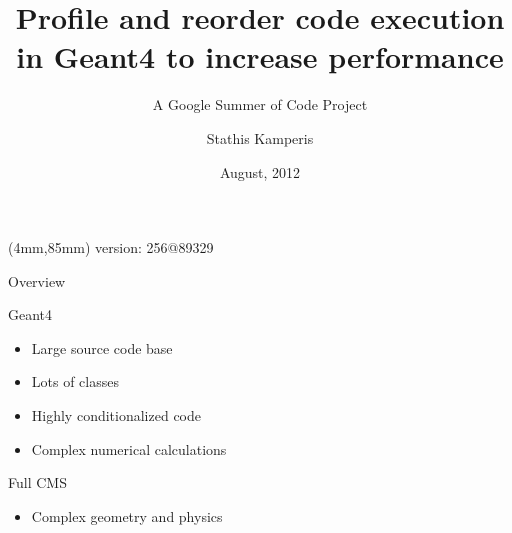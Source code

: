 \documentclass{beamer}
\newenvironment{reference}[2]{%
  \begin{textblock*}{\textwidth}(#1,#2) 
      \tiny\bgroup\color{red!50!black}}{\egroup\end{textblock*}}
\begin{document}
\title{Profile and reorder code execution in Geant4 to increase performance}
\subtitle{A Google Summer of Code Project}
\author{Stathis Kamperis}
\date{August, 2012}

\begin{frame}[plain]
  \titlepage
\begin{reference}{4mm}{85mm}
version: 256@89329
\end{reference} 
\end{frame}

\begin{frame}{Overview}

Geant4
\begin{itemize}
  \item Large source code base
  \item Lots of classes
  \item Highly conditionalized code
  \item Complex numerical calculations
\end{itemize}

Full CMS
\begin{itemize}
	\item Complex geometry and physics
\end{itemize}

\begin{center}
\end{center}
\end{frame}
\end{document}
